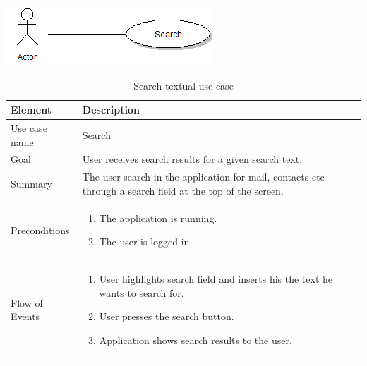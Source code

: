 \begin{table}
\begin{center}
\begin{center}
\includegraphics[width=\textwidth]{search}
\end{center}
\begin{tabular}{p{3cm}|p{12cm}} \hline
\textbf{Element} & \textbf{Description} \\ \hline \hline
Use case name & Search \\
Goal & User receives search results for a given search text. \\
Summary & The user search in the application for mail, contacts etc through a search field at the top of the screen. \\
Preconditions &
\begin{enumerate}
\item{}The application is running.
\item{}The user is logged in.
\end{enumerate} \\ \hline
Flow of Events &
\begin{enumerate}
\item{}User highlights search field and inserts his the text he wants to search for.
\item{}User presses the search button.
\item{}Application shows search results to the user.
\end{enumerate}\\ \hline
\end{tabular}
\end{center}
\caption{Search textual use case} \label{tab:search}
\end{table}

